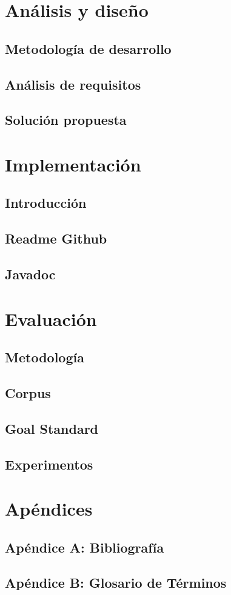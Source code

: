 \documentclass[14pt]{extarticle}
\theoremstyle{definition}
\theoremstyle{remark}
\begin{document}
\section{Análisis y diseño}\label{sec:analisisydiseno}
\subsection{Metodología de desarrollo}\label{sec:metodologiadedesarrollo}
\subsection{Análisis de requisitos}\label{sec:analisisderequisitos}
\subsection{Solución propuesta}\label{sec:solucionpropuesta}
\section{Implementación}\label{sec:implementacion}
\subsection{Introducción}\label{sec:introduccion}
\subsection{Readme Github}\label{sec:readmegithub}
\subsection{Javadoc}\label{sec:javadoc}
\section{Evaluación}\label{sec:evaluacion}
\subsection{Metodología}\label{sec:metodologia}
\subsection{Corpus}\label{sec:corpus}
\subsection{Goal Standard}\label{sec:goalstandard}
\subsection{Experimentos}\label{sec:experimentos}
\section{Apéndices}\label{sec:apendices}
\subsection{Apéndice A: Bibliografía}\label{sec:bibliografia}




\newpage
\subsection{Apéndice B: Glosario de Términos}\label{sec:glosariodeterminos}
\end{document}

